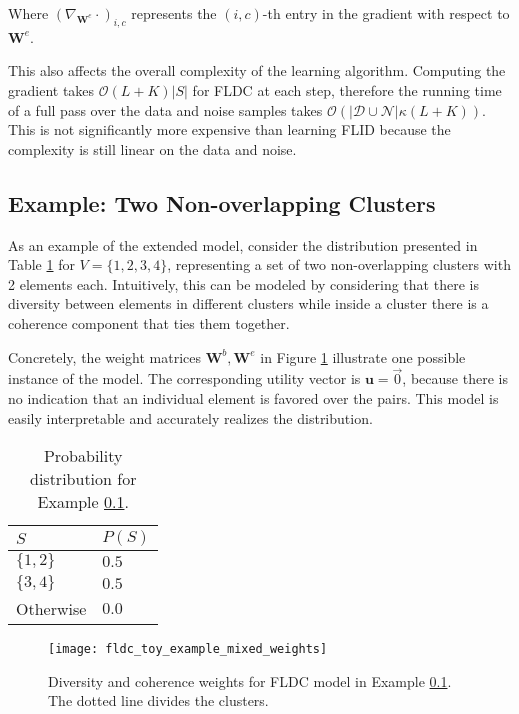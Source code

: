 Where $\left(\nabla_{\mathbf{W}^{e}}\cdot \right)_{i,c}$ represents the $(i,c)$-th entry in the gradient with respect to $\mathbf{W}^{e}$.

This also affects the overall complexity of the learning algorithm. Computing the gradient takes $\mathcal{O}(L+K)|S|$ for FLDC at each step, therefore the running time of a full pass over the data and noise samples takes $\mathcal{O}(|\mathcal{D}\cup\mathcal{N}|\kappa(L+K))$. This is not significantly more expensive than learning FLID because the complexity is still linear on the data and noise.


\subsection{Example: Two Non-overlapping Clusters}
\label{sec:fldc-toy}

As an example of the extended model, consider the distribution presented in Table \ref{tab:fldc-toy-probs} for $V = \{1,2,3,4\}$, representing a set of two non-overlapping clusters with 2 elements each. Intuitively, this can be modeled by considering that there is diversity between elements in different clusters while inside a cluster there is a coherence component that ties them together.

Concretely, the weight matrices $\mathbf{W}^{b}, \mathbf{W}^{e}$ in Figure \ref{fig:fldc-toy-mixed-weights} illustrate one possible instance of the model. The corresponding utility vector is $\mathbf{u} = \overrightarrow{0}$, because there is no indication that an individual element is favored over the pairs. This model is easily interpretable and accurately realizes the distribution.

\begin{table}
  \centering
  \caption{Probability distribution for Example \ref{sec:fldc-toy}.}
  \begin{tabular}{@{}ll@{}}
    \toprule
    $S$ & $P(S)$  \\
    \midrule
    $\{1,2\}$ & $0.5$ \\
    $\{3,4\}$ & $0.5$ \\
    Otherwise & $0.0$ \\
    \bottomrule
  \end{tabular}
  \label{tab:fldc-toy-probs}
\end{table}

\begin{figure}
  \centering
  \texttt{[image: fldc\_toy\_example\_mixed\_weights]}
  \caption{Diversity and coherence weights for FLDC model in Example \ref{sec:fldc-toy}. The dotted line divides the clusters.}
  \label{fig:fldc-toy-mixed-weights}
\end{figure}

